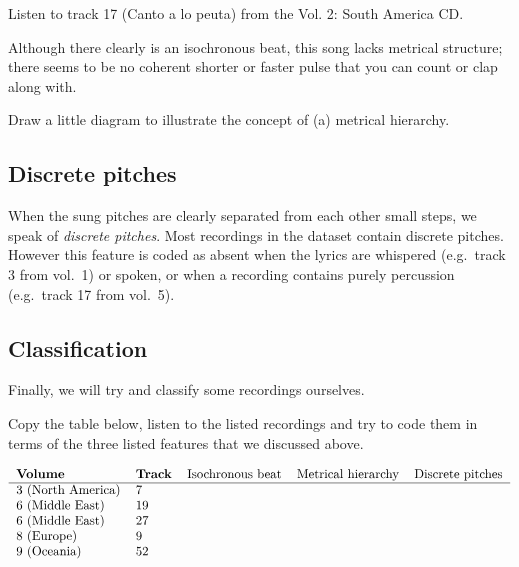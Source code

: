 \documentclass[a4paper, 9pt]{article}
\begin{document}
\begin{exercise}
\action Listen to track 17 (Canto a lo peuta) from the Vol. 2: South America CD.
\end{exercise}

Although there clearly is an isochronous beat, this song lacks metrical
structure; there seems to be no coherent shorter or faster pulse that
you can count or clap along with.

\begin{exercise}
\askstar Draw a little diagram to illustrate the concept of (a) metrical hierarchy. 
\end{exercise}

\subsection{Discrete pitches}\label{discrete-pitches}

When the sung pitches are clearly separated from each other small steps,
we speak of \emph{discrete pitches}. Most recordings in the dataset
contain discrete pitches. However this feature is coded as absent when
the lyrics are whispered (e.g.~track 3 from vol.~1) or spoken, or when a
recording contains purely percussion (e.g.~track 17 from vol.~5).


\subsection{Classification}\label{classification}

Finally, we will try and classify some recordings ourselves.

\begin{exercise}
\action Copy the table below, listen to the listed recordings and try to code them in terms of the three listed features that we discussed above. 
\end{exercise}

\[
\begin{tabular}{lllll}
\textbf{Volume} & \textbf{Track} & Isochronous beat & Metrical hierarchy & Discrete pitches \\
\hline
3 (North America) & 7 &  & & \\
6 (Middle East) & 19 &  & & \\
6 (Middle East) & 27 &  & & \\
8 (Europe) & 9 &  & & \\
9 (Oceania) & 52 &  &  &  \\

\end{tabular}
\]
\end{document}
